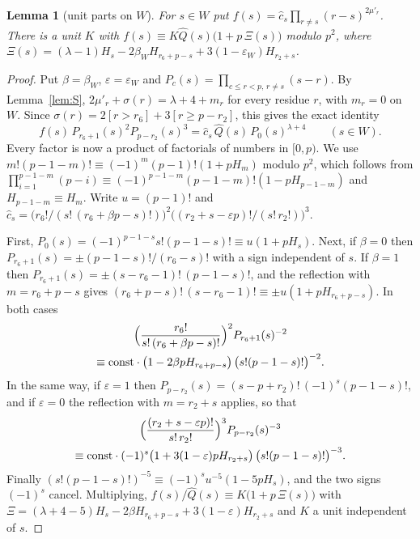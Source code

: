 \documentclass[11pt]{amsart}
\newtheorem{lemma}[theorem]{Lemma}
\theoremstyle{definition}
\theoremstyle{remark}
\numberwithin{equation}{section}
\begin{document}
\begin{lemma}[unit parts on $W$]\label{lem:R}
For $s\in W$ put $f(s)=\hat c_s\prod_{r\ne s}(r-s)^{2\mu'_r}$. There is a unit $K$ with
$f(s)\equiv K\hat Q(s)\bigl(1+p\,\Xi(s)\bigr)$ modulo $p^2$, where
$\Xi(s)=(\lambda-1)H_s-2\beta_WH_{r_6+p-s}+3(1-\varepsilon_W)H_{r_2+s}$.
\end{lemma}

\begin{proof}
Put $\beta=\beta_W$, $\varepsilon=\varepsilon_W$ and $P_c(s)=\prod_{c\le r<p,\,r\ne s}(s-r)$. By Lemma~\ref{lem:S},
$2\mu'_r+\sigma(r)=\lambda+4+m_r$ for every residue $r$, with $m_r=0$ on $W$. Since
$\sigma(r)=2[r>r_6]+3[r\ge p-r_2]$, this gives the exact identity
\[
 f(s)\,P_{r_6+1}(s)^2P_{p-r_2}(s)^3=\hat c_s\,\hat Q(s)\,P_0(s)^{\lambda+4}\qquad(s\in W).
\]
Every factor is now a product of factorials of numbers in $[0,p)$. We use
$m!(p-1-m)!\equiv(-1)^m(p-1)!(1+pH_m)$ modulo $p^2$, which follows from
$\prod_{i=1}^{p-1-m}(p-i)\equiv(-1)^{p-1-m}(p-1-m)!(1-pH_{p-1-m})$ and $H_{p-1-m}\equiv H_m$. Write $u=(p-1)!$ and
$\hat c_s=\bigl(r_6!/(s!\,(r_6+\beta p-s)!)\bigr)^2\bigl((r_2+s-\varepsilon p)!/(s!\,r_2!)\bigr)^3$.

First, $P_0(s)=(-1)^{p-1-s}s!(p-1-s)!\equiv u(1+pH_s)$. Next, if $\beta=0$ then
$P_{r_6+1}(s)=\pm(p-1-s)!/(r_6-s)!$ with a sign independent of $s$. If $\beta=1$ then
$P_{r_6+1}(s)=\pm(s-r_6-1)!\,(p-1-s)!$, and the reflection with $m=r_6+p-s$ gives
$(r_6+p-s)!\,(s-r_6-1)!\equiv\pm u(1+pH_{r_6+p-s})$. In both cases
\begin{multline*}
 \Bigl(\frac{r_6!}{s!\,(r_6+\beta p-s)!}\Bigr)^2P_{r_6+1}(s)^{-2}\\
 \equiv\mathrm{const}\cdot\bigl(1-2\beta pH_{r_6+p-s}\bigr)\,\bigl(s!(p-1-s)!\bigr)^{-2}.
\end{multline*}
In the same way, if $\varepsilon=1$ then $P_{p-r_2}(s)=(s-p+r_2)!\,(-1)^{s}(p-1-s)!$, and if $\varepsilon=0$ the
reflection with $m=r_2+s$ applies, so that
\begin{multline*}
 \Bigl(\frac{(r_2+s-\varepsilon p)!}{s!\,r_2!}\Bigr)^3P_{p-r_2}(s)^{-3}\\
 \equiv\mathrm{const}\cdot(-1)^s\bigl(1+3(1-\varepsilon)pH_{r_2+s}\bigr)\,\bigl(s!(p-1-s)!\bigr)^{-3}.
\end{multline*}
Finally $(s!(p-1-s)!)^{-5}\equiv(-1)^su^{-5}(1-5pH_s)$, and the two signs $(-1)^s$ cancel. Multiplying,
$f(s)/\hat Q(s)\equiv K\bigl(1+p\,\Xi(s)\bigr)$ with $\Xi=(\lambda+4-5)H_s-2\beta H_{r_6+p-s}+3(1-\varepsilon)H_{r_2+s}$
and $K$ a unit independent of $s$.
\end{proof}
\end{document}
